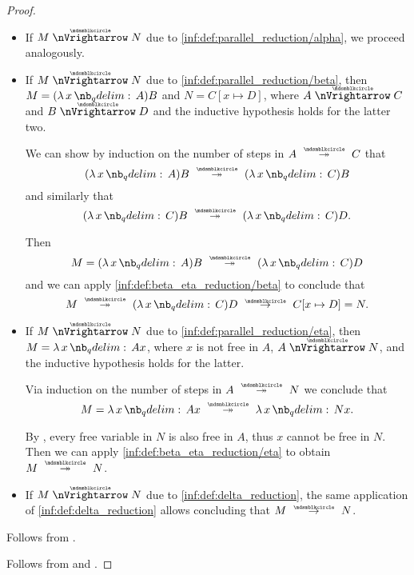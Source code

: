 \begin{proof}
\begin{itemize}
    \item If \( M \ppred N \) due to \ref{inf:def:parallel_reduction/alpha}, we proceed analogously.

    \item If \( M \ppred N \) due to \ref{inf:def:parallel_reduction/beta}, then \( M = (\qabs x A)B \) and \( N = C[x \mapsto D] \), where \( A \ppred C \) and \( B \ppred D \) and the inductive hypothesis holds for the latter two.

    We can show by induction on the number of steps in \( A \pred* C \) that
    \begin{equation*}
      (\qabs x A)B \pred* (\qabs x C)B
    \end{equation*}
    and similarly that
    \begin{equation*}
      (\qabs x C)B \pred* (\qabs x C)D.
    \end{equation*}

    Then
    \begin{equation*}
      M = (\qabs x A) B \pred* (\qabs x C)D
    \end{equation*}
    and we can apply \ref{inf:def:beta_eta_reduction/beta} to conclude that
    \begin{equation*}
      M \pred* (\qabs x C)D \pred C[x \mapsto D] = N.
    \end{equation*}

    \item If \( M \ppred N \) due to \ref{inf:def:parallel_reduction/eta}, then \( M = \qabs x A x \), where \( x \) is not free in \( A \), \( A \ppred N \), and the inductive hypothesis holds for the latter.

    Via induction on the number of steps in \( A \pred* N \) we conclude that
    \begin{equation*}
      M = \qabs x A x \pred* \qabs x N x.
    \end{equation*}

    By , every free variable in \( N \) is also free in \( A \), thus \( x \) cannot be free in \( N \). Then we can apply \ref{inf:def:beta_eta_reduction/eta} to obtain \( M \pred* N \).

    \item If \( M \ppred N \) due to \ref{inf:def:delta_reduction}, the same application of \ref{inf:def:delta_reduction} allows concluding that \( M \pred N \).
  \end{itemize}

   Follows from .

   Follows from  and .
\end{proof}


